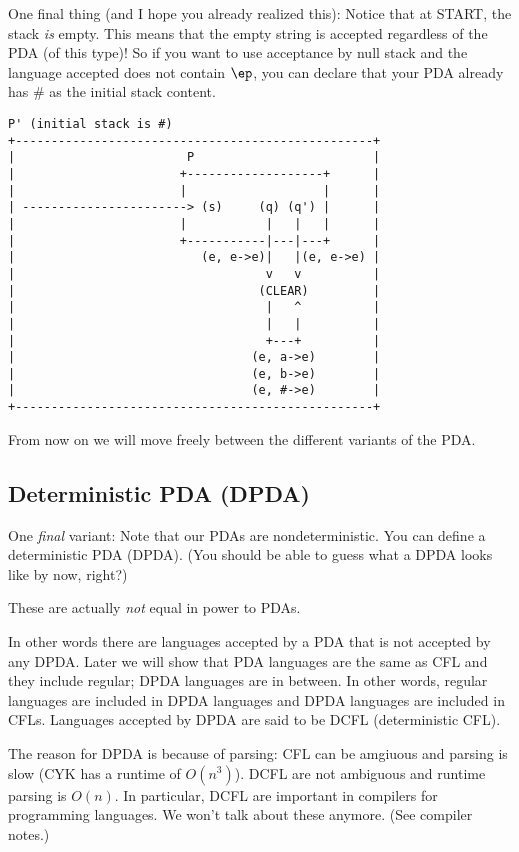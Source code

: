 One final thing (and I hope you already realized this): 
Notice that at START, the stack \textit{ is} empty.
This means that the empty string is accepted regardless of the PDA (of this
type)!
So if you want to use acceptance by null stack and the language accepted
does not contain $\ep$, you can declare that your PDA already has \# as the 
initial stack content.

\begin{samepage}
\begin{verbatim}
P' (initial stack is #)
+--------------------------------------------------+
|                        P                         |
|                       +-------------------+      |
|                       |                   |      |
| -----------------------> (s)     (q) (q') |      |
|                       |           |   |   |      |
|                       +-----------|---|---+      |
|                          (e, e->e)|   |(e, e->e) |
|                                   v   v          |
|                                  (CLEAR)         |
|                                   |   ^          |
|                                   |   |          |
|                                   +---+          |
|                                 (e, a->e)        |
|                                 (e, b->e)        |
|                                 (e, #->e)        |
+--------------------------------------------------+
\end{verbatim}
\end{samepage}

From now on we will move freely between the different variants of the PDA.



\newpage
\subsection{Deterministic PDA (DPDA)}

One \textit{ final} variant:
Note that our PDAs are nondeterministic.
You can define a deterministic PDA (DPDA).
(You should be able to guess what a DPDA looks like by now, right?)

These are actually \textit{ not} equal in power to PDAs.

In other words there are languages accepted by a PDA that is not accepted
by any DPDA.
Later we will show that PDA languages are the same as CFL and they include
regular; DPDA languages are in between.
In other words, regular languages are included in DPDA languages and DPDA
languages are included in CFLs.
Languages accepted by DPDA are said to be DCFL (deterministic CFL).

The reason for DPDA is because of parsing:
CFL can be amgiuous and parsing is slow (CYK has a runtime of $O(n^3)$).
DCFL are not ambiguous and runtime parsing is $O(n)$.
In particular, DCFL are important in compilers for programming languages.
We won't talk about these anymore.
(See compiler notes.)


